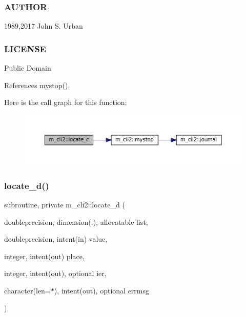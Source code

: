 \subsubsection*{A\+U\+T\+H\+OR}

1989,2017 John S. Urban \subsubsection*{L\+I\+C\+E\+N\+SE}

Public Domain 

References mystop().

Here is the call graph for this function\+:
\nopagebreak
\begin{figure}[H]
\begin{center}
\leavevmode
\includegraphics[width=350pt]{namespacem__cli2_a2199778fea512efcde8778f20765643a_cgraph}
\end{center}
\end{figure}
\mbox{\label{namespacem__cli2_a0e859cd8635ab617ea9a4e9b4ffca852}} 
\subsubsection{\texorpdfstring{locate\+\_\+d()}{locate\_d()}}
{\footnotesize\ttfamily subroutine, private m\+\_\+cli2\+::locate\+\_\+d (\begin{DoxyParamCaption}\item[{doubleprecision, dimension(\+:), allocatable}]{list,  }\item[{doubleprecision, intent(in)}]{value,  }\item[{integer, intent(out)}]{place,  }\item[{integer, intent(out), optional}]{ier,  }\item[{character(len=$\ast$), intent(out), optional}]{errmsg }\end{DoxyParamCaption})\hspace{0.3cm}{\ttfamily [private]}}



